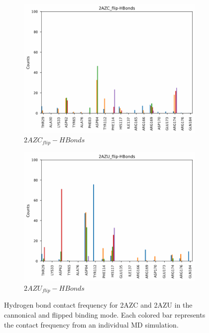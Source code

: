 \begin{figure}[!ht]
\begin{subfigure}{.45\textwidth}
     \includegraphics[width=.95\linewidth]{chapter4/2AZC_flip/2AZC_flip-HBonds.pdf}
     \caption{$2AZC_{flip}-HBonds$}
     \label{fig:2AZC_flip-HBonds}
   \end{subfigure}
    \begin{subfigure}{.45\textwidth}
     \centering
     \includegraphics[width=.95\linewidth]{chapter4/2AZU_flip/2AZU_flip-HBonds.pdf}
     \caption{$2AZU_{flip}-HBonds$}
     \label{fig:2AZU_flip-HBonds}
   \end{subfigure}
\caption[H-Bond Contacts for 2AZC/2AZU]{Hydrogen bond contact frequency for 2AZC and 2AZU in the cannonical and flipped binding mode. Each colored bar represents the contact frequency from an individual MD simulation.}
\label{fig:HBonds}
\end{figure}  

